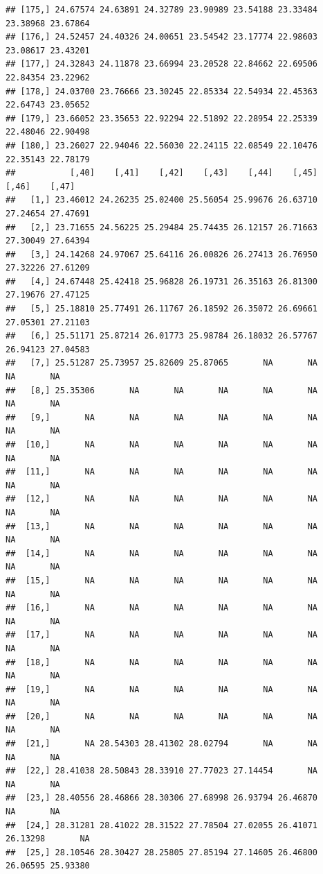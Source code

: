 \documentclass{article}\usepackage[]{graphicx}\usepackage[]{color}
\makeatletter
\newenvironment{kframe}{%
 \def\at@end@of@kframe{}%
 \ifinner\ifhmode%
  \def\at@end@of@kframe{\end{minipage}}%
  \begin{minipage}{\columnwidth}%
 \fi\fi%
 \def\FrameCommand##1{\hskip\@totalleftmargin \hskip-\fboxsep
 \colorbox{shadecolor}{##1}\hskip-\fboxsep
     \hskip-\linewidth \hskip-\@totalleftmargin \hskip\columnwidth}%
 \MakeFramed {\advance\hsize-\width
   \@totalleftmargin\z@ \linewidth\hsize
   \@setminipage}}%
 {\par\unskip\endMakeFramed%
 \at@end@of@kframe}
\newenvironment{knitrout}{}{} %
\makeatother
\begin{document}
\begin{knitrout}
\begin{kframe}
\begin{verbatim}
## [175,] 24.67574 24.63891 24.32789 23.90989 23.54188 23.33484 23.38968 23.67864
## [176,] 24.52457 24.40326 24.00651 23.54542 23.17774 22.98603 23.08617 23.43201
## [177,] 24.32843 24.11878 23.66994 23.20528 22.84662 22.69506 22.84354 23.22962
## [178,] 24.03700 23.76666 23.30245 22.85334 22.54934 22.45363 22.64743 23.05652
## [179,] 23.66052 23.35653 22.92294 22.51892 22.28954 22.25339 22.48046 22.90498
## [180,] 23.26027 22.94046 22.56030 22.24115 22.08549 22.10476 22.35143 22.78179
##           [,40]    [,41]    [,42]    [,43]    [,44]    [,45]    [,46]    [,47]
##   [1,] 23.46012 24.26235 25.02400 25.56054 25.99676 26.63710 27.24654 27.47691
##   [2,] 23.71655 24.56225 25.29484 25.74435 26.12157 26.71663 27.30049 27.64394
##   [3,] 24.14268 24.97067 25.64116 26.00826 26.27413 26.76950 27.32226 27.61209
##   [4,] 24.67448 25.42418 25.96828 26.19731 26.35163 26.81300 27.19676 27.47125
##   [5,] 25.18810 25.77491 26.11767 26.18592 26.35072 26.69661 27.05301 27.21103
##   [6,] 25.51171 25.87214 26.01773 25.98784 26.18032 26.57767 26.94123 27.04583
##   [7,] 25.51287 25.73957 25.82609 25.87065       NA       NA       NA       NA
##   [8,] 25.35306       NA       NA       NA       NA       NA       NA       NA
##   [9,]       NA       NA       NA       NA       NA       NA       NA       NA
##  [10,]       NA       NA       NA       NA       NA       NA       NA       NA
##  [11,]       NA       NA       NA       NA       NA       NA       NA       NA
##  [12,]       NA       NA       NA       NA       NA       NA       NA       NA
##  [13,]       NA       NA       NA       NA       NA       NA       NA       NA
##  [14,]       NA       NA       NA       NA       NA       NA       NA       NA
##  [15,]       NA       NA       NA       NA       NA       NA       NA       NA
##  [16,]       NA       NA       NA       NA       NA       NA       NA       NA
##  [17,]       NA       NA       NA       NA       NA       NA       NA       NA
##  [18,]       NA       NA       NA       NA       NA       NA       NA       NA
##  [19,]       NA       NA       NA       NA       NA       NA       NA       NA
##  [20,]       NA       NA       NA       NA       NA       NA       NA       NA
##  [21,]       NA 28.54303 28.41302 28.02794       NA       NA       NA       NA
##  [22,] 28.41038 28.50843 28.33910 27.77023 27.14454       NA       NA       NA
##  [23,] 28.40556 28.46866 28.30306 27.68998 26.93794 26.46870       NA       NA
##  [24,] 28.31281 28.41022 28.31522 27.78504 27.02055 26.41071 26.13298       NA
##  [25,] 28.10546 28.30427 28.25805 27.85194 27.14605 26.46800 26.06595 25.93380

\end{verbatim}
\end{kframe}
\end{knitrout}
\end{document}
